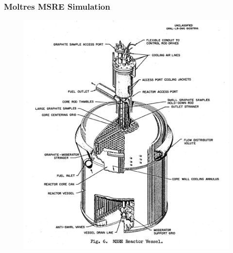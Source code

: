 \begin{frame}
  \frametitle{Moltres \gls{MSRE} Simulation}
              \begin{figure}[t]
               \hspace*{-0.25in}
                \includegraphics[height=0.65\textwidth]{./images/msre.png}
               \end{figure}   
\end{frame}

